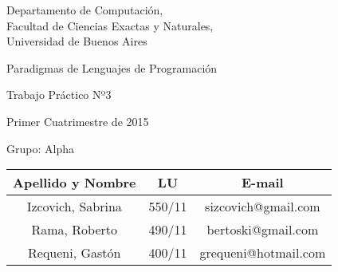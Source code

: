\documentclass[10pt, a4paper]{article}
\author{Algoritmos y Estructuras de Datos III, DC, UBA.}
\date{}
\begin{document}
	
\thispagestyle{caratula}

\begin{center}

\vspace{2cm}

Departamento de Computación,\\
Facultad de Ciencias Exactas y Naturales,\\
Universidad de Buenos Aires

\vspace{4cm}

\begin{Huge}
Paradigmas de Lenguajes de Programación
\end{Huge}

\vspace{0.5cm}

\begin{huge}
Trabajo Práctico Nº3
\end{huge}

\vspace{1cm}

Primer Cuatrimestre de 2015

\vspace{4cm}


\begin{Large}
Grupo: Alpha
\end{Large}

\vspace{1cm}

\begin{tabular}{|c|c|c|}
\hline
Apellido y Nombre & LU & E-mail\\
\hline
Izcovich, Sabrina      & 550/11 & sizcovich@gmail.com\\
Rama, Roberto        & 490/11 & bertoski@gmail.com\\
Requeni, Gastón        & 400/11 & grequeni@hotmail.com\\
\hline
\end{tabular}

\end{center}

\newpage
\end{document}

